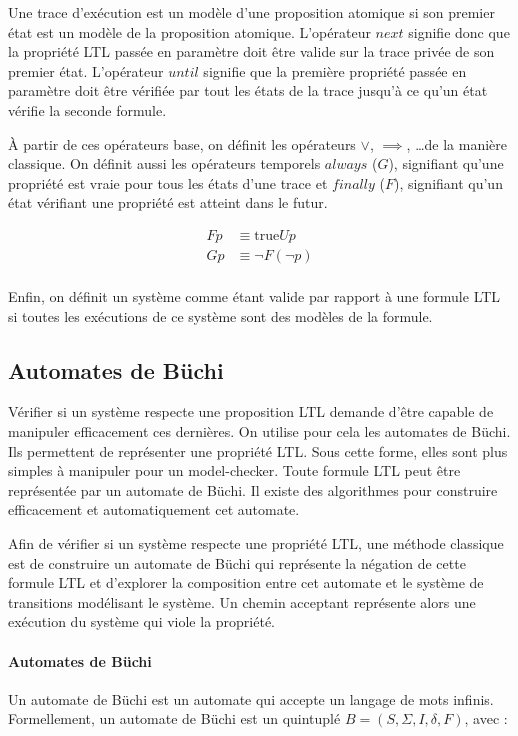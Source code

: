 Une trace d'exécution est un modèle d'une proposition atomique si son premier
état est un modèle de la proposition atomique.
L'opérateur \(next\) signifie donc que la propriété \ac{LTL} passée en
paramètre doit être valide sur la trace privée de son premier état.
L'opérateur \(until\) signifie que la première propriété passée en
paramètre doit être vérifiée par tout les états de la trace jusqu'à ce qu'un
état vérifie la seconde formule.

À partir de ces opérateurs base, on définit les opérateurs \(\lor\),
\(\implies\), \dots de la manière classique. On définit aussi les
opérateurs temporels \(always\) (\(G\)), signifiant qu'une propriété est
vraie pour tous les états d'une trace et \(finally\) (\(F\)), signifiant
qu'un état vérifiant une propriété est atteint dans le futur.

\[
\begin{aligned}
F p & \equiv \text{true} U p \\
G p & \equiv \lnot F (\lnot p)\\
\end{aligned}
\]

Enfin, on définit un système comme étant valide par rapport à une
formule \ac{LTL} si toutes les exécutions de ce système sont des modèles de
la formule.

\subsection{Automates de Büchi}

Vérifier si un système respecte une proposition \ac{LTL} demande d'être capable de
manipuler efficacement ces dernières. On utilise pour cela les automates de
Büchi. Ils permettent de représenter une propriété \ac{LTL}. Sous cette forme, elles
sont plus simples à manipuler pour un model-checker. Toute formule \ac{LTL} peut être
représentée par un automate de Büchi. Il existe des algorithmes pour construire
efficacement et automatiquement cet automate\citep{ltl2ba}.

Afin de vérifier si un système respecte une propriété \ac{LTL}, une méthode classique
est de construire un automate de Büchi qui représente la négation de cette
formule \ac{LTL} et d'explorer la composition entre cet automate et le système de
transitions modélisant le système. Un chemin acceptant représente alors une
exécution du système qui viole la propriété.

\paragraph{Automates de Büchi}
Un automate de Büchi est un automate qui accepte un langage de mots
infinis. Formellement, un automate de Büchi est un quintuplé
\(B = (S, \Sigma, I, \delta, F)\), avec :

